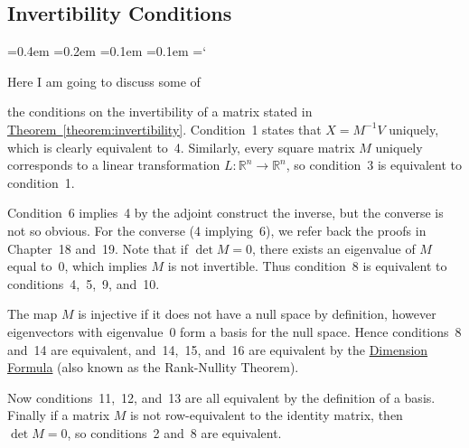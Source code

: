 
\subsection*{Invertibility Conditions}

{\ttfamily
{}\font=0.4em
\font=0.2em
\font=0.1em
\font=0.1em
\hyphenchar\font=`\-


\hypertarget{scripts_kernel_range_nullity_rank_inv_cond}{Here I am going to discuss some of} the conditions on the invertibility of a matrix stated in \hyperref[theorem:invertibility]{Theorem~\ref*{theorem:invertibility}}. Condition~1 states that $X = M^{-1}V$ uniquely, which is clearly equivalent to~4. Similarly, every square matrix $M$ uniquely corresponds to a linear transformation $L \colon \mathbb{R}^n \rightarrow \mathbb{R}^n$, so condition~3 is equivalent to condition~1.

Condition~6 implies~4 by the adjoint construct the inverse, but the converse is not so obvious. For the converse (4 implying~6), we refer back the proofs in Chapter~18 and~19. Note that if $\det M = 0$, there exists an eigenvalue of $M$ equal to~$0$, which implies $M$ is not invertible. Thus condition~8 is equivalent to conditions~4,~5,~9, and~10.

The map $M$ is injective if it does not have a null space by definition, however eigenvectors with eigenvalue~$0$ form a basis for the null space. Hence conditions~8 and~14 are equivalent, and~14,~15, and~16 are equivalent by the \hyperref[dimension_formula]{Dimension Formula} (also known as the Rank-Nullity Theorem).

Now conditions~11,~12, and~13 are all equivalent by the definition of a basis. Finally if a matrix $M$ is not row-equivalent to the identity matrix, then $\det M = 0$, so conditions~2 and~8 are equivalent.

} %

